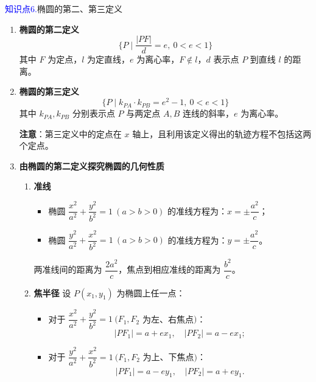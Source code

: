 \documentclass{article}
\begin{document}
\;\;\;\;\textcolor{blue}{知识点6.}椭圆的第二、第三定义
\vspace{1\baselineskip}

\begin{enumerate}
    \item \textbf{椭圆的第二定义}
    \[
    \{ P \mid \frac{|PF|}{d} = e,\ 0 < e < 1 \}
    \]
    其中 \(F\) 为定点，\(l\) 为定直线，\(e\) 为离心率，\(F \notin l\)，\(d\) 表示点 \(P\) 到直线 \(l\) 的距离。

    \item \textbf{椭圆的第三定义}
    \[
    \{ P \mid k_{PA} \cdot k_{PB} = e^2 - 1,\ 0 < e < 1 \}
    \]
    其中 \(k_{PA}, k_{PB}\) 分别表示点 \(P\) 与两定点 \(A, B\) 连线的斜率，\(e\) 为离心率。

    \textbf{注意}：第三定义中的定点在 \(x\) 轴上，且利用该定义得出的轨迹方程不包括这两个定点。


    \item \textbf{由椭圆的第二定义探究椭圆的几何性质}
    \begin{enumerate}
        \item \textbf{准线}
        \begin{itemize}
            \item 椭圆 \(\dfrac{x^2}{a^2} + \dfrac{y^2}{b^2} = 1\ (a > b > 0)\) 的准线方程为：\(x = \pm \dfrac{a^2}{c}\)；
            \item 椭圆 \(\dfrac{y^2}{a^2} + \dfrac{x^2}{b^2} = 1\ (a > b > 0)\) 的准线方程为：\(y = \pm \dfrac{a^2}{c}\)。
        \end{itemize}
        两准线间的距离为 \(\dfrac{2a^2}{c}\)，焦点到相应准线的距离为 \(\dfrac{b^2}{c}\)。

        \item \textbf{焦半径}
        设 \(P(x_1, y_1)\) 为椭圆上任一点：
        \begin{itemize}
            \item 对于 \(\dfrac{x^2}{a^2} + \dfrac{y^2}{b^2} = 1\ (F_1,F_2\) 为左、右焦点\()\)：
            \[
            |PF_1| = a + ex_1, \quad |PF_2| = a - ex_1;
            \]
            \item 对于 \(\dfrac{y^2}{a^2} + \dfrac{x^2}{b^2} = 1\ (F_1,F_2\) 为上、下焦点\()\)：
            \[
            |PF_1| = a - ey_1, \quad |PF_2| = a + ey_1.
            \]
        \end{itemize}
    \end{enumerate}
\end{enumerate}
\vspace{1\baselineskip}
\end{document}
